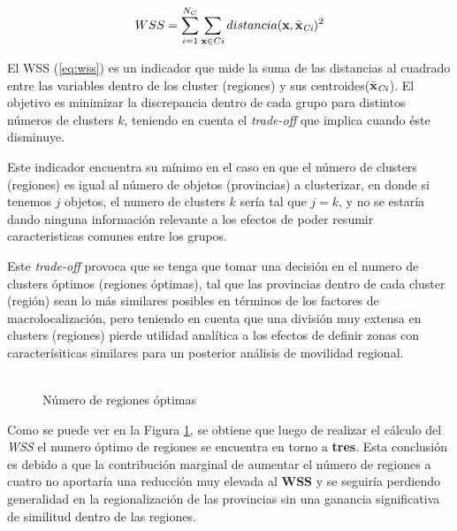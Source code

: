 \documentclass[12pt,a4paper]{article}
\begin{document}
\vspace{5mm}
\begin {center}
\begin{equation}\label{eq:wss}
WSS=\sum_{i=1}^{N_{C}} \sum_{\textbf{x}\in Ci} distancia(\textbf{x},\bar{\textbf{x}}_{\tiny{\textit{Ci}}})^{2}
\end{equation}
\end {center}
\vspace{5mm}


El WSS (\ref{eq:wss}) es un indicador que mide la suma de las distancias al cuadrado entre las variables dentro de  los cluster (regiones) y sus centroides($\bar{\textbf{x}}_{\tiny{\textit{Ci}}}$). El objetivo es minimizar la discrepancia dentro de cada grupo para distintos números de clusters $k$, teniendo en cuenta el \textit{trade-off} que implica cuando éste disminuye. 

Este indicador encuentra su mínimo en el caso en que el número de clusters (regiones) es igual al número de objetos (provincias) a clusterizar, en donde si tenemos $j$ objetos, el numero de clusters $k$ sería tal que $j=k$, y no se estaría dando ninguna información relevante a los efectos de poder resumir caracteristicas comunes entre los grupos. 

Este \textit{trade-off} provoca que se tenga que tomar una decisión en el numero de clusters óptimos (regiones óptimas), tal que las provincias dentro de cada cluster (región) sean lo más similares posibles en términos de los factores de macrolocalización, pero teniendo en cuenta que una división muy extensa en clusters (regiones) pierde utilidad analítica a los efectos de definir zonas con caracterísiticas similares para un posterior análisis de movilidad regional.

\begin{figure}[h!]
\begin{center}
	\caption{\\Número de regiones óptimas}
 	
	\label{figure:optimas}
\end{center}
\end{figure}
\newpage

Como se puede ver en la Figura \ref{figure:optimas}, se obtiene que luego de realizar el cálculo del \textit{WSS} el numero óptimo de regiones se encuentra en torno a \textbf{tres}. Esta conclusión es debido a que la contribución marginal de aumentar el número de  regiones a cuatro no aportaría una reducción muy elevada al \textbf{WSS} y se seguiría perdiendo generalidad en la regionalización de las provincias sin una ganancia significativa de similitud dentro de las regiones.
\end{document}
